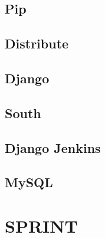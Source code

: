 \documentclass{abnt}
\begin{document}
	
	
	\section{Pip}
	\section{Distribute}
	\section{Django}
	
	
	\section{South}
	\section{Django Jenkins}
	\blindtext
	
	\section{MySQL}
	\blindtext
	

\clearpage
\chapter{SPRINT}
	
	\blindtext

	\blindtext

		

\clearpage
\nocite{*}

%		
		
\end{document}
